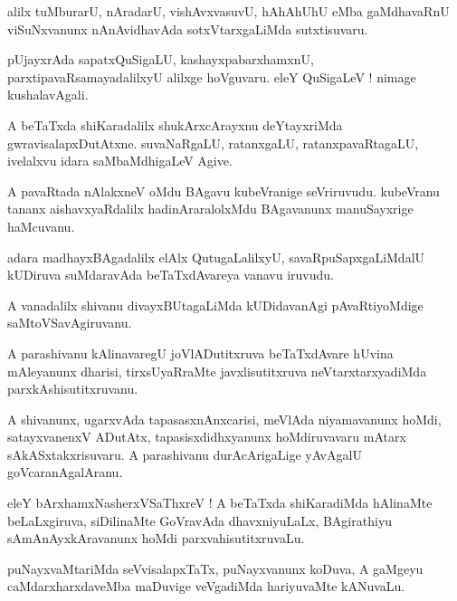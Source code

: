 \documentclass{article}
\begin{document}
\begin{mn}
alilx tuMburarU, nAradarU, vishAvxvasuvU, hAhAhUhU eMba gaMdhavaRnU 
viSuNxvanunx nAnAvidhavAda sotxVtarxgaLiMda sutxtisuvaru.
\end{mn}

\begin{mn}
pUjayxrAda sapatxQuSigaLU, kashayxpabarxhamxnU, parxtipavaRsamayadalilxyU alilxge hoVguvaru.
eleY QuSigaLeV ! nimage kushalavAgali.
\end{mn}

\begin{mn}
A beTaTxda shiKaradalilx shukArxcArayxnu deYtayxriMda gwravisalapxDutAtxne. 
suvaNaRgaLU, ratanxgaLU, ratanxpavaRtagaLU, ivelalxvu idara saMbaMdhigaLeV Agive. 
\end{mn}

\begin{mn}
A pavaRtada nAlakxneV oMdu BAgavu kubeVranige seVriruvudu. 
kubeVranu tananx aishavxyaRdalilx hadinAraralolxMdu BAgavanunx manuSayxrige haMcuvanu.
\end{mn}

\begin{mn}
adara madhayxBAgadalilx elAlx QutugaLalilxyU, 
savaRpuSapxgaLiMdalU kUDiruva suMdaravAda beTaTxdAvareya vanavu iruvudu.
\end{mn}

\begin{mn}
A vanadalilx shivanu divayxBUtagaLiMda kUDidavanAgi pAvaRtiyoMdige saMtoVSavAgiruvanu.
\end{mn}

\begin{mn}
A parashivanu kAlinavaregU joVlADutitxruva beTaTxdAvare hUvina mAleyanunx dharisi, 
tirxsUyaRraMte javxlisutitxruva neVtarxtarxyadiMda parxkAshisutitxruvanu.
\end{mn}

\begin{mn}
A shivanunx, ugarxvAda tapasasxnAnxcarisi, meVlAda niyamavanunx hoMdi, 
satayxvanenxV ADutAtx, tapasisxdidhxyanunx hoMdiruvavaru mAtarx sAkASxtakxrisuvaru. 
A parashivanu durAcArigaLige yAvAgalU goVcaranAgalAranu.
\end{mn}

\begin{mn}
eleY bArxhamxNasherxVSaThxreV ! A beTaTxda shiKaradiMda hAlinaMte beLaLxgiruva, 
siDilinaMte GoVravAda dhavxniyuLaLx, BAgirathiyu sAmAnAyxkAravanunx hoMdi parxvahisutitxruvaLu. 
\end{mn}

\begin{mn}
puNayxvaMtariMda seVvisalapxTaTx, puNayxvanunx koDuva, 
A gaMgeyu caMdarxharxdaveMba maDuvige veVgadiMda hariyuvaMte kANuvaLu.
\end{mn}
\end{document}

